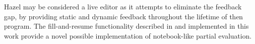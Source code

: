 Hazel may be considered a live editor as it attempts to eliminate the feedback gap, by providing static and dynamic feedback throughout the lifetime of then program. The fill-and-resume functionality described in \cite{conf/popl/HazelnutLive19} and implemented in this work provide a novel possible implementation of notebook-like partial evaluation.

